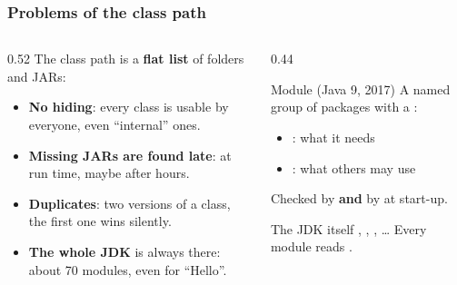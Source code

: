 \documentclass[aspectratio=169,10pt,compress]{beamer}
\begin{document}
\begin{frame}[t,fragile] \frametitle{Problems of the class path}
  \begin{columns}[T]
    \begin{column}{0.52\textwidth}
      The class path is a \textbf{flat list} of folders and JARs:
      \begin{itemize}\small
        \item \textbf{No hiding}: every  class is usable by everyone, even ``internal'' ones.
        \item \textbf{Missing JARs are found late}:  at run time, maybe after hours.
        \item \textbf{Duplicates}: two versions of a class, the first one wins silently.
        \item \textbf{The whole JDK} is always there: about 70 modules, even for ``Hello''.
      \end{itemize}
    \end{column}
    \begin{column}{0.44\textwidth}
      \begin{block}{Module (Java 9, 2017)}
        \small A named group of packages with a :
        \begin{itemize}
          \item {}: what it needs
          \item {}: what others may use
        \end{itemize}
        Checked by  \textbf{and} by  at start-up.
      \end{block}
      \begin{block}{The JDK itself}
        \small {}, , , \dots{} Every module reads .
      \end{block}
    \end{column}
  \end{columns}
\end{frame}
\end{document}

